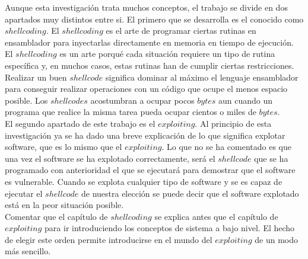 \documentclass [titlepage, 12pt]{article}
\begin{document}
Aunque esta investigaci\'on trata muchos conceptos, el trabajo se divide en dos apartados muy distintos entre si. El primero que se desarrolla es el conocido como $shellcoding$. El $shellcoding$ es el arte de programar ciertas rutinas en ensamblador para inyectarlas directamente en memoria en tiempo de ejecuci\'on. El $shellcoding$ es un arte porqu\'e cada situaci\'on requiere un tipo de rutina espec\'ifica y, en muchos casos, estas rutinas han de cumplir ciertas restricciones. Realizar un buen $shellcode$ significa dominar al m\'aximo el lenguaje ensamblador para conseguir realizar operaciones con un c\'odigo que ocupe el menos espacio posible. Los $shellcodes$ acostumbran a ocupar pocos $bytes$ aun cuando un programa que realice la misma tarea pueda ocupar cientos o miles de $bytes$.\\
El segundo apartado de este trabajo es el $exploiting$. Al principio de esta investigaci\'on ya se ha dado una breve explicaci\'on de lo que significa explotar software, que es lo mismo que el $exploiting$. Lo que no se ha comentado es que una vez el software se ha explotado correctamente, ser\'a el $shellcode$ que se ha programado con anterioridad el que se ejecutar\'a para demostrar que el software es vulnerable. Cuando se explota cualquier tipo de software y se es capaz de ejecutar el $shellcode$ de nuestra elecci\'on se puede decir que el software explotado est\'a en la peor situaci\'on posible.\\
Comentar que el cap\'itulo de $shellcoding$ se explica antes que el cap\'itulo de $exploiting$ para ir introduciendo los conceptos de sistema a bajo nivel. El hecho de elegir este orden permite introducirse en el mundo del $exploiting$ de un modo m\'as sencillo. \bigskip
\end{document}
